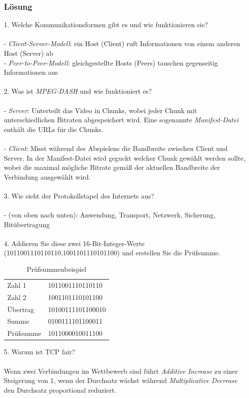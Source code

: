 \subsubsection{Lösung}
1. Welche Kommunikationsformen gibt es und wie funktionieren sie? \\
\\
- \textit{Client-Server-Modell}: ein Host (Client) ruft Informationen von einem anderen Host (Server) ab \\
- \textit{Peer-to-Peer-Modell}: gleichgestellte Hosts (Peers) tauschen gegenseitig Informationen aus \\
\\
2. Was ist \textit{MPEG-DASH} und wie funktioniert es? \\
\\
- \textit{Server}: Unterteilt das Video in Chunks, wobei jeder Chunk mit unterschiedlichen Bitraten abgespeichert wird. Eine sogenannte \textit{Manifest-Datei} enthält die URLs für die Chunks. \\
\\
- \textit{Client}: Misst während des Abspielens die Bandbreite zwischen Client und Server. In der Manifest-Datei wird geguckt welcher Chunk gewählt werden sollte, wobei die maximal mögliche Bitrate gemäß der aktuellen Bandbreite der Verbindung ausgewählt wird. \\
\\
3. Wie sieht der Protokollstapel des Internets aus? \\
\\
- (von oben nach unten): Anwendung, Transport, Netzwerk, Sicherung, Bitübertragung \\
\\
4. Addieren Sie diese zwei 16-Bit-Integer-Werte (1011001110110110,1001101110101100) und erstellen Sie die Prüfsumme. 
\begin{table}[htbp]
\centering
\caption{Prüfsummenbeispiel}
\label{my-label}
\begin{tabular}{ll}
Zahl 1    & 1011001110110110  \\
Zahl 2    & 1001101110101100  \\
Übertrag  & 10100111101100010 \\
Summe     & 0100111101100011  \\
Prüfsumme & 1011000010011100 
\end{tabular}
\end{table}

5. Warum ist TCP fair? \\
\\
Wenn zwei Verbindungen im Wettbewerb sind führt \textit{Additive Increase} zu einer Steigerung von 1, wenn der Durchsatz wächst während \textit{Multiplicative Decrease} den Durchsatz proportional reduziert.


